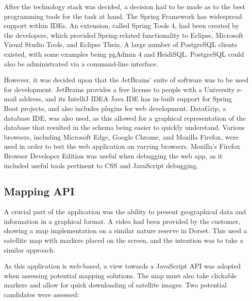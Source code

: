 After the technology stack was decided, a decision had to be made as to the best programming tools for the task at hand. The Spring Framework has widespread support within IDEs. An extension, called Spring Tools 4, had been created by the developers, which provided Spring-related functionality to Eclipse, Microsoft Visual Studio Tools, and Eclipse Theia\cite{SpringTools}. A large number of PostgreSQL clients existed, with some examples being pgAdmin 4 and HeidiSQL. PostgreSQL could also be administrated via a command-line interface\cite{PostgresTools}.

However, it was decided upon that the JetBrains' suite of software was to be used for development. JetBrains provides a free license to people with a University e-mail address\cite{JetBrainsStudent}, and its IntelliJ IDEA Java IDE has in-built support for Spring Boot projects, and also includes plugins for web development. DataGrip, a database IDE, was also used, as this allowed for a graphical representation of the database that resulted in the schema being easier to quickly understand. Various browsers, including Microsoft Edge, Google Chrome, and Mozilla Firefox, were used in order to test the web application on varying browsers. Mozilla's Firefox Browser Developer Edition was useful when debugging the web app, as it included useful tools pertinent to CSS and JavaScript debugging\cite{Mozilla}.

\subsection{Mapping API}

A crucial part of the application was the ability to present geographical data and information in a graphical format. A video had been provided by the customer, showing a map implementation on a similar nature reserve in Dorset. This used a satellite map with markers placed on the screen, and the intention was to take a similar approach\cite{OspreyVideo}.

As this application is web-based, a view towards a JavaScript API was adopted when assessing potential mapping solutions. The map must also take clickable markers and allow for quick downloading of satellite images. Two potential candidates were assessed:

